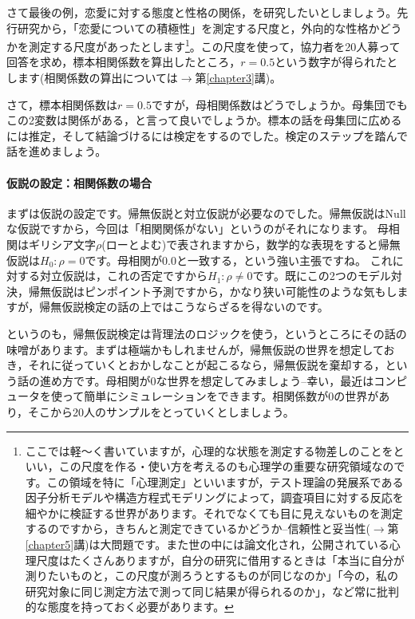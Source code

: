 \documentclass{ltjsarticle}
\begin{document}
さて最後の例，恋愛に対する態度と性格の関係，を研究したいとしましょう。先行研究から，「恋愛についての積極性」を測定する尺度と，外向的な性格かどうかを測定する尺度があったとします\footnote{ここでは軽〜く書いていますが，心理的な状態を測定する物差しのことをといい，この尺度を作る・使い方を考えるのも心理学の重要な研究領域なのです。この領域を特に「心理測定」といいますが，テスト理論の発展系である因子分析モデルや構造方程式モデリングによって，調査項目に対する反応を細やかに検証する世界があります。それでなくても目に見えないものを測定するのですから，きちんと測定できているかどうか--信頼性と妥当性($\to$第\ref{chapter5}講)は大問題です。また世の中には論文化され，公開されている心理尺度はたくさんありますが，自分の研究に借用するときは「本当に自分が測りたいものと，この尺度が測ろうとするものが同じなのか」「今の，私の研究対象に同じ測定方法で測って同じ結果が得られるのか」，など常に批判的な態度を持っておく必要があります。}。この尺度を使って，協力者を20人募って回答を求め，標本相関係数を算出したところ，$r=0.5$という数字が得られたとします(相関係数の算出については$\to$第\ref{chapter3}講)。

さて，標本相関係数は$r=0.5$ですが，母相関係数はどうでしょうか。母集団でもこの2変数は関係がある，と言って良いでしょうか。標本の話を母集団に広めるには推定，そして結論づけるには検定をするのでした。検定のステップを踏んで話を進めましょう。

\paragraph{仮説の設定：相関係数の場合}
まずは仮説の設定です。帰無仮説と対立仮説が必要なのでした。帰無仮説はNullな仮説ですから，今回は「相関関係がない」というのがそれになります。
母相関はギリシア文字$\rho$(ローとよむ)で表されますから，数学的な表現をすると帰無仮説は$H_0: \rho =0$です。母相関が$0.0$と一致する，という強い主張ですね。
これに対する対立仮説は，これの否定ですから$H_1:\rho \neq 0$です。既にこの2つのモデル対決，帰無仮説はピンポイント予測ですから，かなり狭い可能性のような気もしますが，帰無仮説検定の話の上ではこうならざるを得ないのです。

というのも，帰無仮説検定は背理法のロジックを使う，というところにその話の味噌があります。まずは極端かもしれませんが，帰無仮説の世界を想定しておき，それに従っていくとおかしなことが起こるなら，帰無仮説を棄却する，という話の進め方です。母相関が0な世界を想定してみましょう--幸い，最近はコンピュータを使って簡単にシミュレーションをできます。相関係数が0の世界があり，そこから20人のサンプルをとっていくとしましょう。
\end{document}
